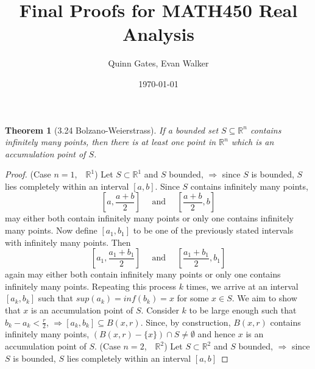 \documentclass[aps,pra,notitlepage,amsmath,amssymb,letterpaper,12pt]{revtex4-1}
\newtheorem{theorem}{Theorem}
\begin{document}
\title{Final Proofs for MATH450 Real Analysis}
\author{Quinn Gates, Evan Walker}
\date{\today}

\maketitle


\begin{theorem}[3.24 Bolzano-Weierstrass]
If a bounded set $S \subseteq \mathbb{R}^n$ contains infinitely many points, then there is at least one point in $\mathbb{R}^n$ which is an accumulation point of $S$.
\end{theorem}

\begin{proof}
(Case $n=1$,$\quad \mathbb{R}^{1}$)
Let $S \subset \mathbb{R}^{1}$ and $S$ bounded, $\Rightarrow$ since $S$ is bounded, $S$ lies completely within an interval $[a,b]$. Since $S$ contains infinitely many points,
$$[a,\frac{a+b}{2}] \quad \textrm{ and }  \quad [\frac{a+b}{2},b]$$
may either both contain infinitely many points or only one contains infinitely many points. Now define $[a_{1},b_{1}]$ to be one of the previously stated intervals with infinitely many points. Then
$$[a_{1},\frac{a_{1}+b_{1}}{2}] \quad \textrm{ and }  \quad [\frac{a_{1}+b_{1}}{2},b_{1}]$$
again may either both contain infinitely many points or only one contains infinitely many points. Repeating this process $k$ times, we arrive at an interval $[a_{k},b_{k}]$
such that $sup(a_{k}) = inf(b_{k}) = x$ for some $x \in S$. We aim to show that $x$ is an accumulation point of $S$. Consider $k$ to be large enough such that $b_{k} - a_{k} < \frac{r}{2}$, $\Rightarrow [a_{k},b_{k}] \subseteq B(x,r)$. Since, by construction, $B(x,r)$ contains infinitely many points, $(B(x,r) - \{x\}) \cap S \ne \emptyset$ and hence $x$ is an accumulation point of $S$.
\newline{}
(Case $n=2$,$\quad \mathbb{R}^{2}$) Let $S \subset \mathbb{R}^{2}$ and $S$ bounded, $\Rightarrow$ since $S$ is bounded, $S$ lies completely within an interval $[a,b]$
\end{proof}
\end{document}
